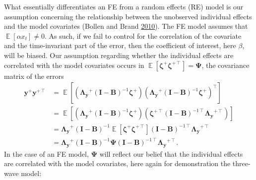 \documentclass[
  12pt,
  a4paper]{article}
\DeclareMathOperator{\E}{\mathbb{E}}
\begin{document}
What essentially differentiates an FE from a random effects (RE) model
is our assumption concerning the relationship between the unobserved
individual effects and the model covariates (Bollen and Brand
\protect\hyperlink{ref-Bollen2010}{2010}). The FE model assumes that
\(\E[\alpha x_{t}] \ne 0\). As such, if we fail to control for the
correlation of the covariate and the time-invariant part of the error,
then the coefficient of interest, here \(\beta\), will be biased. Our
assumption regarding whether the individual effects are correlated with
the model covariates occurs in
\(\E[\bm{\zeta}^{+}\bm{\zeta}^{+ \intercal}] = \bm{\Psi}\), the
covariance matrix of the errors \begin{align}
\bm{y}^{+}\bm{y}^{+ \intercal} & = \E[(\bm{\Lambda_{y}}^{+}(\bm{I} - \bm{B})^{-1}\bm{\zeta}^{+})(\bm{\Lambda_{y}}^{+}(\bm{I} - \bm{B})^{-1}\bm{\zeta}^{+})^{\intercal}] \\
 & = \E[(\bm{\Lambda_{y}}^{+}(\bm{I} - \bm{B})^{-1}\bm{\zeta}^{+})(\bm{\zeta}^{+ \intercal}(\bm{I} - \bm{B})^{-1 \intercal}\bm{\Lambda_{y}}^{+ \intercal})] \\
 & = \bm{\Lambda_{y}}^{+}(\bm{I} - \bm{B})^{-1} \E[\bm{\zeta}^{+}\bm{\zeta}^{+ \intercal}] (\bm{I} - \bm{B})^{-1 \intercal}\bm{\Lambda_{y}}^{+ \intercal} \\
 & = \bm{\Lambda_{y}}^{+}(\bm{I} - \bm{B})^{-1} \bm{\Psi} (\bm{I} - \bm{B})^{-1 \intercal}\bm{\Lambda_{y}}^{+ \intercal}.
\end{align} In the case of an FE model, \(\bm{\Psi}\) will reflect our
belief that the individual effects are correlated with the model
covariates, here again for demonstration the three-wave model:
\end{document}
